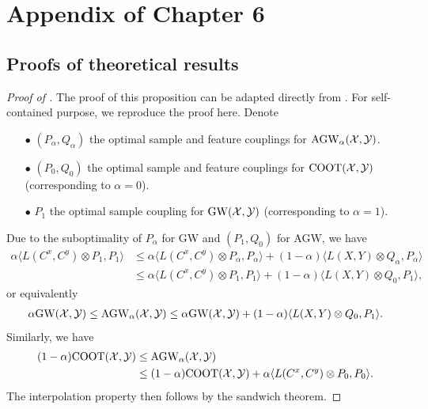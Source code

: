 \section{Appendix of Chapter 6}

\subsection{Proofs of theoretical results}

\begin{proof}[Proof of ]
  The proof of this proposition can be adapted directly from \citep{Vayer19b}.
  For self-contained purpose, we reproduce the proof here. Denote
  \begin{itemize}
      \item[$\bullet$] $(P_{\alpha}, Q_{\alpha})$ the optimal sample and feature couplings for
      $\text{AGW}_{\alpha}(\mathcal X, \mathcal Y)$.

      \item[$\bullet$] $(P_0, Q_0)$ the optimal sample and feature couplings for
      $\text{COOT}(\mathcal X, \mathcal Y)$ (corresponding to $\alpha = 0$).

      \item[$\bullet$] $P_1$ the optimal sample coupling for $\text{GW}(\mathcal X, \mathcal Y)$
      (corresponding to $\alpha = 1$).
  \end{itemize}
  Due to the suboptimality of $P_{\alpha}$ for GW and $(P_1, Q_0)$ for AGW, we have
  \begin{align}
      \alpha \langle L(C^x, C^y) \otimes P_1, P_1 \rangle
      &\leq \alpha \langle L(C^x, C^y) \otimes P_{\alpha}, P_{\alpha} \rangle
      + (1 - \alpha) \langle L(X, Y) \otimes Q_{\alpha}, P_{\alpha} \rangle \\
      &\leq \alpha \langle L(C^x, C^y) \otimes P_1, P_1 \rangle
      + (1 - \alpha) \langle L(X, Y) \otimes Q_0, P_1 \rangle,
  \end{align}
  or equivalently
  \begin{align}
      \alpha \text{GW}(\mathcal X, \mathcal Y) \leq \text{AGW}_{\alpha}(\mathcal X, \mathcal Y) \leq \alpha \text{GW}(\mathcal X, \mathcal Y)
      + (1 - \alpha) \langle L(X, Y) \otimes Q_0, P_1 \rangle.
  \end{align}
  Similarly, we have
  \begin{align}
      (1 - \alpha) \text{COOT}(\mathcal X, \mathcal Y) &\leq \text{AGW}_{\alpha}(\mathcal X, \mathcal Y) \\
      &\leq (1 - \alpha) \text{COOT}(\mathcal X, \mathcal Y) + \alpha \langle L(C^x, C^y) \otimes P_0, P_0 \rangle.
  \end{align}
  The interpolation property then follows by the sandwich theorem.


\end{proof}
